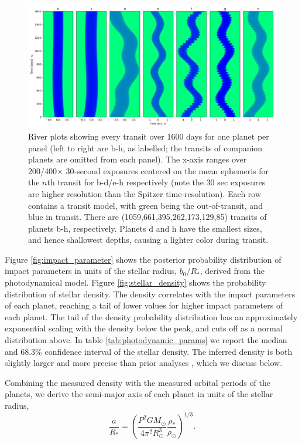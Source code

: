 \documentclass[fleqn,usenatbib]{mnras} %
\begin{document}
\begin{figure}
    \centering
    \includegraphics[width=\hsize]{figures/T1_riverplot.png}
    \caption{River plots showing every transit over 1600 days for one planet per panel
    (left to right are b-h, as labelled; the
    transits of companion planets are omitted from each panel).
    The x-axis ranges over 200/400$\times$ 30-second exposures centered on the mean ephemeris for the $n$th transit
    for b-d/e-h respectively (note the 30 sec exposures are higher resolution than the Spitzer time-resolution).
    Each row contains a transit model, with green being the out-of-transit, and blue in
    transit.  There are (1059,661,395,262,173,129,85) transits of planets b-h, respectively.  
    Planets d and h have the smallest sizes, and hence shallowest depths, causing a lighter 
    color during transit.}
    \label{fig:riverplot}
\end{figure}

Figure \ref{fig:impact_parameter} shows the posterior probability distribution of impact
parameters in units of the stellar radius, $b_0/R_*$, derived from the photodynamical 
model.  Figure \ref{fig:stellar_density} shows the probability distribution of stellar 
density.  The density correlates with the impact
parameters of each planet, reaching a tail of lower values
for higher impact parameters of each planet.  The tail of the density probability
distribution has an approximately exponential scaling with the density below the
peak, and cuts off as a normal distribution above.  In table \ref{tab:photodynamic_params} 
we report the median and 68.3\% confidence interval
of the stellar density.  The inferred density is both slightly larger and more precise
than prior analyses \citep{Delrez2018a}, which we discuss below.

Combining the measured density with the measured orbital periods of the planets,
we derive the semi-major axis of each planet in units of the stellar radius,
\begin{equation}
    \frac{a}{R_*} = \left(\frac{P^2 G M_\odot}{4\pi^2 R_\odot^3} \frac{\rho_*}{\rho_\odot}\right)^{1/3}.
\end{equation}
\end{document}
